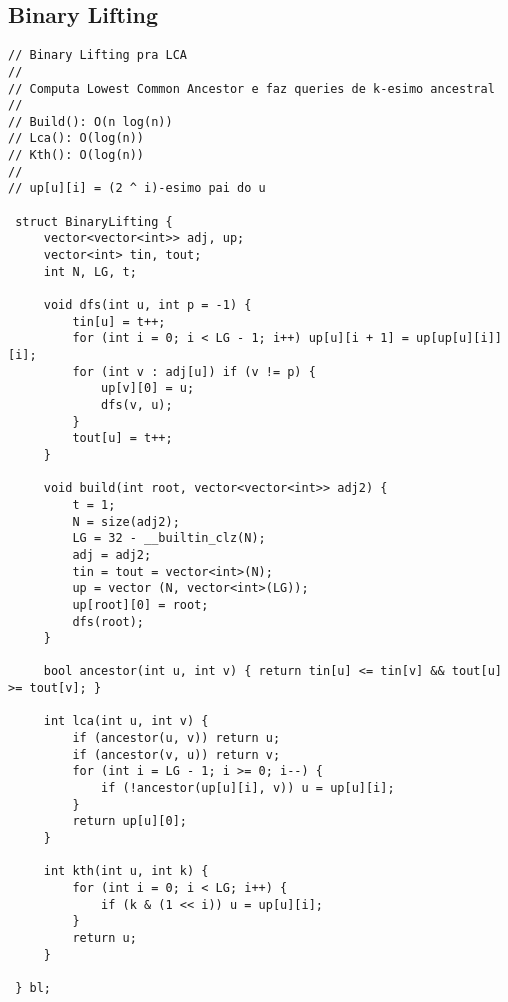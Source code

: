 \documentclass[11pt, a4paper, twoside]{article}
\begin{document}
\subsection{Binary Lifting}
\begin{lstlisting}
// Binary Lifting pra LCA
//
// Computa Lowest Common Ancestor e faz queries de k-esimo ancestral
//
// Build(): O(n log(n))
// Lca(): O(log(n))
// Kth(): O(log(n))
//
// up[u][i] = (2 ^ i)-esimo pai do u

 struct BinaryLifting {
     vector<vector<int>> adj, up;
     vector<int> tin, tout;
     int N, LG, t;
 
     void dfs(int u, int p = -1) {
         tin[u] = t++;
         for (int i = 0; i < LG - 1; i++) up[u][i + 1] = up[up[u][i]][i];
         for (int v : adj[u]) if (v != p) {
             up[v][0] = u;
             dfs(v, u);
         }
         tout[u] = t++;
     }
 
     void build(int root, vector<vector<int>> adj2) {
         t = 1;
         N = size(adj2);
         LG = 32 - __builtin_clz(N);
         adj = adj2;
         tin = tout = vector<int>(N);
         up = vector (N, vector<int>(LG));
         up[root][0] = root;
         dfs(root);
     }
 
     bool ancestor(int u, int v) { return tin[u] <= tin[v] && tout[u] >= tout[v]; }
 
     int lca(int u, int v) {
         if (ancestor(u, v)) return u;
         if (ancestor(v, u)) return v;
         for (int i = LG - 1; i >= 0; i--) {
             if (!ancestor(up[u][i], v)) u = up[u][i];
         }
         return up[u][0];
     }
 
     int kth(int u, int k) {
         for (int i = 0; i < LG; i++) {
             if (k & (1 << i)) u = up[u][i];
         }
         return u;
     }
 
 } bl;
\end{lstlisting}
\end{document}
